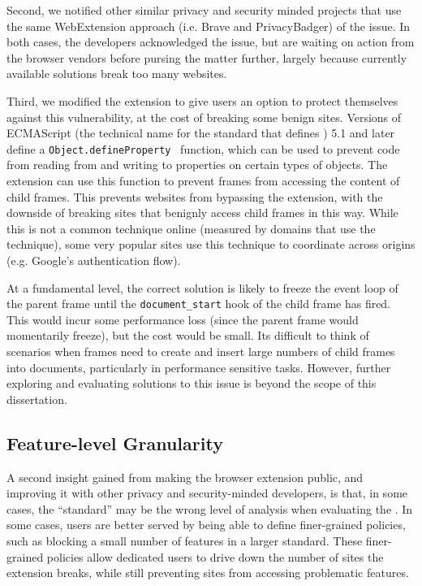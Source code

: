 Second, we notified other similar privacy and security minded
projects that use the same WebExtension approach (i.e. Brave and PrivacyBadger)
of the issue.  In both cases, the developers acknowledged the issue, but are
waiting on action from the browser vendors before pursing the matter further,
largely because currently available solutions break too many websites.

Third, we modified the extension to give users an option to protect themselves
against this vulnerability, at the cost of breaking some benign sites.  Versions
of ECMAScript (the technical name for the standard that defines \JS) 5.1
and later define a \texttt{Object.defineProperty}~\cite{ecmascript51} function,
which can be used to prevent code from reading from and writing to properties
on certain types of objects.  The extension can use this
function to prevent frames from accessing the content of child frames.
This prevents websites from bypassing the extension, with the downside of
breaking sites that benignly access child frames in this way.  While this
is not a common technique online (measured by domains that use the technique),
some very popular sites use this technique to coordinate across origins (e.g.
Google's authentication flow).

At a fundamental level, the correct solution is likely to freeze the event loop
of the parent frame until the \texttt{document\_start}
hook of the child frame has fired.  This would incur some performance
loss (since the parent frame would momentarily freeze), but the cost would
be small.  Its difficult to think of scenarios when frames need
to create and insert large numbers of child frames into documents, particularly
in performance sensitive tasks.  However, further exploring and evaluating
solutions to this issue is beyond the scope of this dissertation.


\subsection{Feature-level Granularity}
\label{current-web:extension-deployment:feature-level}
A second insight gained from making the browser extension public, and improving
it with other privacy and security-minded developers, is that, in some cases,
the ``standard'' may be the wrong level of analysis when evaluating the
\WAPI.  In some cases, users are better served by being able to define
finer-grained policies, such as blocking a small number of features in a larger
standard.  These finer-grained policies allow dedicated users to drive down the
number of sites the extension breaks, while still preventing sites from
accessing problematic \WAPI features.

